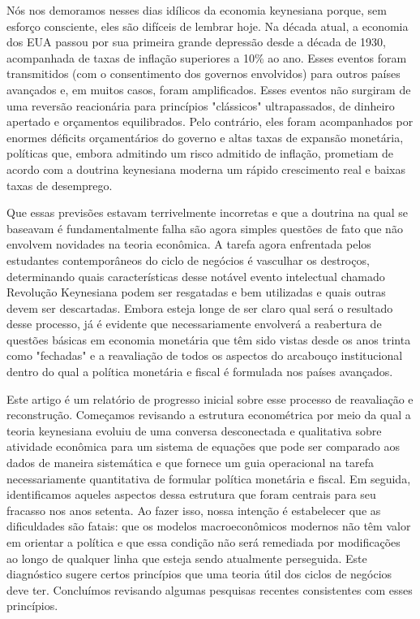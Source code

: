 \documentclass[a4paper,12pt]{article}[abntex2]
\begin{document}
Nós nos demoramos nesses dias idílicos da economia keynesiana porque, sem esforço consciente, eles são difíceis de lembrar hoje. Na década atual, a economia dos EUA passou por sua primeira grande depressão desde a década de 1930, acompanhada de taxas de inflação superiores a 10\% ao ano. Esses eventos foram transmitidos (com o consentimento dos governos envolvidos) para outros países avançados e, em muitos casos, foram amplificados. Esses eventos não surgiram de uma reversão reacionária para princípios "clássicos" ultrapassados, de dinheiro apertado e orçamentos equilibrados. Pelo contrário, eles foram acompanhados por enormes déficits orçamentários do governo e altas taxas de expansão monetária, políticas que, embora admitindo um risco admitido de inflação, prometiam de acordo com a doutrina keynesiana moderna um rápido crescimento real e baixas taxas de desemprego.

Que essas previsões estavam terrivelmente incorretas e que a doutrina na qual se baseavam é fundamentalmente falha são agora simples questões de fato que não envolvem novidades na teoria econômica. A tarefa agora enfrentada pelos estudantes contemporâneos do ciclo de negócios é vasculhar os destroços, determinando quais características desse notável evento intelectual chamado Revolução Keynesiana podem ser resgatadas e bem utilizadas e quais outras devem ser descartadas. Embora esteja longe de ser claro qual será o resultado desse processo, já é evidente que necessariamente envolverá a reabertura de questões básicas em economia monetária que têm sido vistas desde os anos trinta como "fechadas" e a reavaliação de todos os aspectos do arcabouço institucional dentro do qual a política monetária e fiscal é formulada nos países avançados.

Este artigo é um relatório de progresso inicial sobre esse processo de reavaliação e reconstrução. Começamos revisando a estrutura econométrica por meio da qual a teoria keynesiana evoluiu de uma conversa desconectada e qualitativa sobre atividade econômica para um sistema de equações que pode ser comparado aos dados de maneira sistemática e que fornece um guia operacional na tarefa necessariamente quantitativa de formular política monetária e fiscal. Em seguida, identificamos aqueles aspectos dessa estrutura que foram centrais para seu fracasso nos anos setenta. Ao fazer isso, nossa intenção é estabelecer que as dificuldades são fatais: que os modelos macroeconômicos modernos não têm valor em orientar a política e que essa condição não será remediada por modificações ao longo de qualquer linha que esteja sendo atualmente perseguida. Este diagnóstico sugere certos princípios que uma teoria útil dos ciclos de negócios deve ter. Concluímos revisando algumas pesquisas recentes consistentes com esses princípios.
\end{document}
